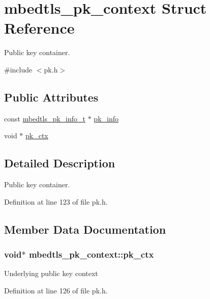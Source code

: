 \hypertarget{structmbedtls__pk__context}{\section{mbedtls\-\_\-pk\-\_\-context Struct Reference}
\label{structmbedtls__pk__context}
}


Public key container.  




{\ttfamily \#include $<$pk.\-h$>$}

\subsection*{Public Attributes}
\begin{DoxyCompactItemize}
\item 
const \hyperlink{structmbedtls__pk__info__t}{mbedtls\-\_\-pk\-\_\-info\-\_\-t} $\ast$ \hyperlink{structmbedtls__pk__context_a3dac25bf08a411a2479107e14fa90550}{pk\-\_\-info}
\item 
void $\ast$ \hyperlink{structmbedtls__pk__context_aa6a3a0dbdf30848261eaf687a6368af4}{pk\-\_\-ctx}
\end{DoxyCompactItemize}


\subsection{Detailed Description}
Public key container. 

Definition at line 123 of file pk.\-h.



\subsection{Member Data Documentation}
\hypertarget{structmbedtls__pk__context_aa6a3a0dbdf30848261eaf687a6368af4}{
\subsubsection[{pk\-\_\-ctx}]{\setlength{\rightskip}{0pt plus 5cm}void$\ast$ mbedtls\-\_\-pk\-\_\-context\-::pk\-\_\-ctx}}\label{structmbedtls__pk__context_aa6a3a0dbdf30848261eaf687a6368af4}
Underlying public key context 

Definition at line 126 of file pk.\-h.

